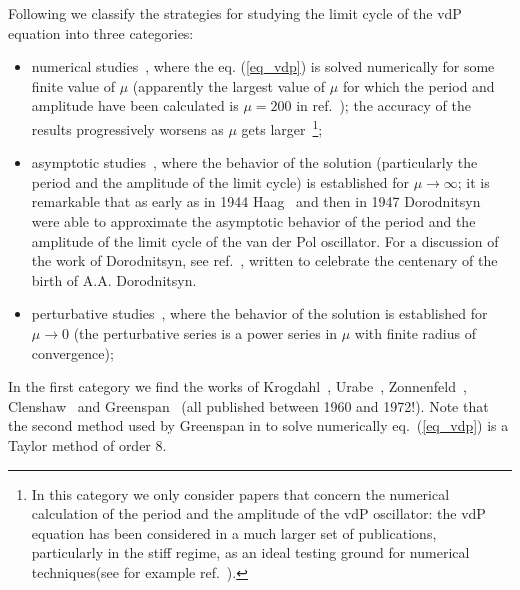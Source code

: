 \documentclass[final]{article}
\begin{document}
Following \cite{Amore18} we classify the strategies for studying the limit cycle of the vdP equation into three categories:
\begin{itemize}
\item  numerical studies~\cite{Krogdahl60, Urabe60, Ponzo65b, Zonneveld66, Clenshaw66,Greenspan72}, where the eq. (\ref{eq_vdp}) is solved numerically for some finite value of $\mu$ (apparently the largest value of $\mu$ for which the period and amplitude have been calculated is  $\mu=200$ in ref.~\cite{Ponzo65b}); the accuracy of the results progressively worsens as $\mu$ gets larger~\footnote{In this category we only consider papers that concern the numerical calculation of the period and the amplitude of the vdP oscillator: the vdP equation has been considered in a much larger set of publications, particularly in the stiff regime, as an ideal testing ground for numerical techniques(see for example ref.~\cite{Wanner96,Anne04,Eriksson04,Fazio08,Boom18}).};
\item asymptotic studies~\cite{Haag43, Haag43b, Haag44, Dor47, Dor52, Urabe63, Ponzo65, Ponzo65b, OMalley68,MacGillivray83a,MacGillivray83b}, where the behavior of the solution (particularly the period and the amplitude of the limit cycle) is established for $\mu \rightarrow \infty$; it is  remarkable that as early as in 1944 Haag~\cite{Haag44} and then in 1947 Dorodnitsyn~\cite{Dor47} were able to approximate the asymptotic behavior of the 
period and the amplitude of the limit cycle of the van der Pol oscillator. For a discussion of the  work of Dorodnitsyn, see ref.~\cite{Kerimov11}, written to celebrate the centenary of the birth of A.A. Dorodnitsyn.
\item perturbative studies~\cite{Deprit67,Deprit68,Deprit79,Andersen82,Dadfar84,Buonomo98,Amore04,Suetin12,Amore18}, where the behavior of the solution is established for $\mu \rightarrow 0$ (the perturbative series is a power series in $\mu$ with finite radius of convergence);
\end{itemize}

In the first category we find the works of Krogdahl~\cite{Krogdahl60},  Urabe~\cite{Urabe60}, Zonnenfeld~\cite{Zonneveld66}, Clenshaw~\cite{Clenshaw66} and Greenspan~\cite{Greenspan72} (all published between 1960 and 1972!).
Note that the second method used by Greenspan in \cite{Greenspan72} to solve numerically eq.~(\ref{eq_vdp}) is  a Taylor method of order $8$. 
\end{document}
